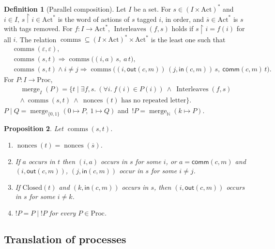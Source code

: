 \documentclass[11pt]{article}
\theoremstyle{definition}
\newtheorem{definition}{Definition}[section]
\theoremstyle{plain}
\newtheorem{proposition}[definition]{Proposition}
\theoremstyle{remark}
\newcommand{\N}{\mathbb{N}}
\newcommand{\Act}{\mathrm{Act}}
\newcommand{\Proc}{\mathrm{Proc}}
\newcommand{\aout}{\mathsf{out}}
\newcommand{\ain}{\mathsf{in}}
\newcommand{\acomm}{\mathsf{comm}}
\newcommand{\Closed}{\mathrm{Closed}}
\newcommand{\nonces}{\operatorname{nonces}}
\newcommand{\comms}{\operatorname{comms}}
\newcommand{\mrg}{\operatorname{merge}}
\newcommand{\interleaves}{\operatorname{Interleaves}}
\begin{document}
\begin{definition}[Parallel composition]\label{def:par}
Let $I$ be a set. For $s\in(I\times\Act)^*$ and $i\in I$, $s{\restriction}i\in\Act^*$ is the word of actions of $s$ tagged $i$, in order, and $\overline{s}\in\Act^*$ is $s$ with tags removed. For $f:I\to\Act^*$, $\interleaves(f,s)$ holds if $s{\restriction}i=f(i)$ for all $i$. The relation $\comms\subseteq(I\times\Act)^*\times\Act^*$ is the least one such that
\begin{align*}
&\comms(\varepsilon,\varepsilon),\\
&\comms(s,t)\Rightarrow\comms\big((i,a)\,s,\ a\,t\big),\\
&\comms(s,t)\wedge i\ne j\Rightarrow\comms\big((i,\aout(c,m))\,(j,\ain(c,m))\,s,\ \acomm(c,m)\,t\big).
\end{align*}
For $P:I\to\Proc$,
\begin{multline*}
\mrg_I(P)=\{t\mid \exists f,s.\ (\forall i.\ f(i)\in P(i))\ \wedge\ \interleaves(f,s)\\
\wedge\ \comms(s,t)\ \wedge\ \nonces(t)\text{ has no repeated letter}\}.
\end{multline*}
$P\mid Q=\mrg_{\{0,1\}}(0\mapsto P,\ 1\mapsto Q)$ and $\,!P=\mrg_{\N}(k\mapsto P)$.
\end{definition}

\begin{proposition}\label{prop:comms}
Let $\comms(s,t)$.
\begin{enumerate}
\item $\nonces(t)=\nonces(\overline{s})$.
\item If $a$ occurs in $t$ then $(i,a)$ occurs in $s$ for some $i$, or $a=\acomm(c,m)$ and $(i,\aout(c,m))$, $(j,\ain(c,m))$ occur in $s$ for some $i\ne j$.
\item If $\Closed(t)$ and $(k,\ain(c,m))$ occurs in $s$, then $(i,\aout(c,m))$ occurs in $s$ for some $i\ne k$.
\item $!P=P\mid{!P}$ for every $P\in\Proc$.
\end{enumerate}
\end{proposition}

\subsection{Translation of processes}
\end{document}
